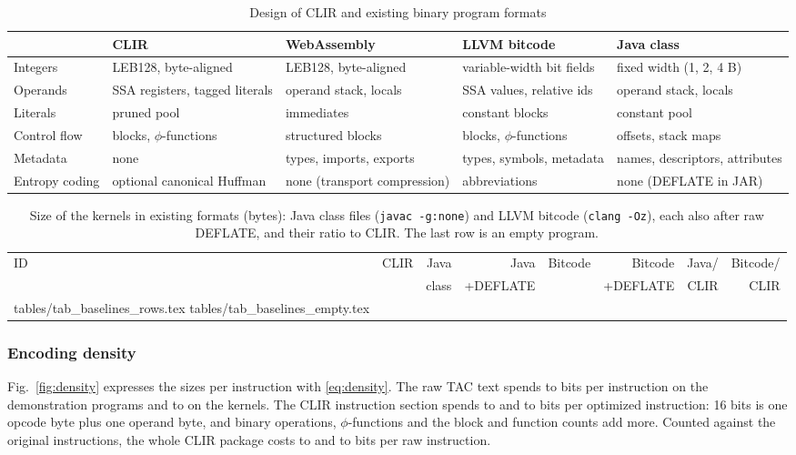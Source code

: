 \documentclass{ieeeaccess}
\makeatletter
\newcommand{\clir}{CLIR}
\newcommand{\rowsfrom}[1]{\@@input #1 }
\makeatother
\begin{document}
\begin{table}[!t]
\centering
\caption{Design of \clir{} and existing binary program formats}
\label{tab:formats}
\footnotesize
\setlength{\tabcolsep}{2.5pt}
\begin{tabular}{@{}p{11mm} p{16.5mm} p{16.5mm} p{16.5mm} p{16.5mm}@{}}
\toprule
 & \clir{} & WebAssembly & LLVM bitcode & Java class \\
\midrule
Integers & LEB128, byte-aligned & LEB128, byte-aligned & variable-width bit fields & fixed width (1, 2, 4 B) \\
Operands & SSA registers, tagged literals & operand stack, locals & SSA values, relative ids & operand stack, locals \\
Literals & pruned pool & immediates & constant blocks & constant pool \\
Control flow & blocks, $\phi$-functions & structured blocks & blocks, $\phi$-functions & offsets, stack maps \\
Metadata & none & types, imports, exports & types, symbols, metadata & names, descriptors, attributes \\
Entropy coding & optional canonical Huffman & none (transport compression) & abbreviations & none (DEFLATE in JAR) \\
\bottomrule
\end{tabular}
\end{table}

\begin{table}[!t]
\centering
\caption{Size of the kernels in existing formats (bytes): Java class files (\texttt{javac -g:none}) and LLVM bitcode (\texttt{clang -Oz}), each also after raw DEFLATE, and their ratio to \clir{}. The last row is an empty program.}
\label{tab:baselines}
\footnotesize
\setlength{\tabcolsep}{2.6pt}
\begin{tabular}{@{}l r r r r r r r@{}}
\toprule
ID & \clir{} & Java & Java & Bitcode & Bitcode & Java/ & Bitcode/ \\
 & & class & +DEFLATE & & +DEFLATE & \clir{} & \clir{} \\
\midrule
\rowsfrom{tables/tab_baselines_rows.tex}
\midrule
\rowsfrom{tables/tab_baselines_empty.tex}
\bottomrule
\end{tabular}
\end{table}

\subsubsection{Encoding density}
Fig.~\ref{fig:density} expresses the sizes per instruction with \eqref{eq:density}. The raw TAC text spends \ndensRawSMin{} to \ndensRawSMax{} bits per instruction on the demonstration programs and \ndensRawKMin{} to \ndensRawKMax{} on the kernels. The \clir{} instruction section spends \ndensBodySMin{} to \ndensBodySMax{} and \ndensBodyKMin{} to \ndensBodyKMax{} bits per optimized instruction: 16 bits is one opcode byte plus one operand byte, and binary operations, $\phi$-functions and the block and function counts add more. Counted against the original instructions, the whole \clir{} package costs \ndensPkgSMin{} to \ndensPkgSMax{} and \ndensPkgKMin{} to \ndensPkgKMax{} bits per raw instruction.
\end{document}
